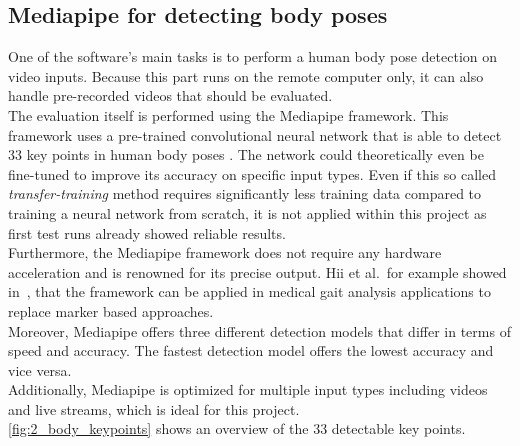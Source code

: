 \subsection{Mediapipe for detecting body poses}\label{subsec:2_mediapipe_framework}
One of the software's main tasks is to perform a human body pose detection on
video inputs.
Because this part runs on the remote computer only, it can also handle
pre-recorded videos that should be evaluated.\\
The evaluation itself is performed using the Mediapipe framework.
This framework uses a pre-trained convolutional neural network that is able to
detect 33 key points in human body poses \cite{mediapipe_paper}.
The network could theoretically even be fine-tuned to improve its accuracy on
specific input types.
Even if this so called \textit{transfer-training} method requires significantly
less training data compared to training a neural network from scratch, it is 
not applied within this project as first test runs already showed reliable 
results.\\
Furthermore, the Mediapipe framework does not require any hardware acceleration
and is renowned for its precise output.
Hii et al.~for example showed in~\cite{mp_gait_analysis}, 
\cite{gupta_knee_2023} that the framework can be applied in medical gait 
analysis applications to replace marker based approaches.\\
Moreover, Mediapipe offers three different detection models that differ in 
terms of speed and accuracy.
The fastest detection model offers the lowest accuracy and vice versa.\\
Additionally, Mediapipe is optimized for multiple input types including videos 
and live streams, which is ideal for this project.\\
\autoref{fig:2_body_keypoints} shows an overview of the 33 detectable key 
points. 
